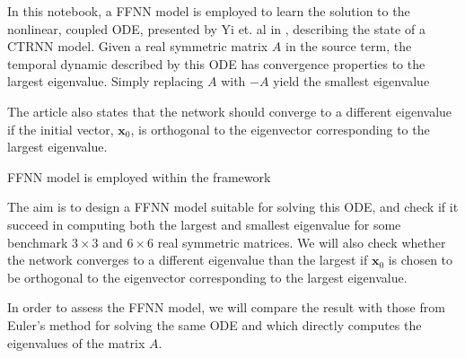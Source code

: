 In this notebook, a FFNN model is employed to learn the solution to the nonlinear, coupled ODE, presented by Yi et. al in \cite{yfh04}, describing the state of a CTRNN model. Given a real symmetric matrix $A$ in the source term, the temporal dynamic described by this ODE has convergence properties to the largest eigenvalue. Simply replacing $A$ with $-A$ yield the smallest eigenvalue

The article also states that the network should converge to a different eigenvalue if the initial vector, $\mathbf{x}_0$, is orthogonal to the eigenvector corresponding to the largest eigenvalue.

FFNN model is employed within the  framework


The aim is to design a FFNN model suitable for solving this ODE, and check if it succeed in computing both the largest and smallest eigenvalue for some benchmark $3\times 3$ and $6\times 6$ real symmetric matrices. We will also check whether the network converges to a different eigenvalue than the largest if $\mathbf{x}_0$ is chosen to be orthogonal to the eigenvector corresponding to the largest eigenvalue. 

In order to assess the FFNN model, we will compare the result with those from Euler's method for solving the same ODE and   which directly computes the eigenvalues of the matrix $A$.
